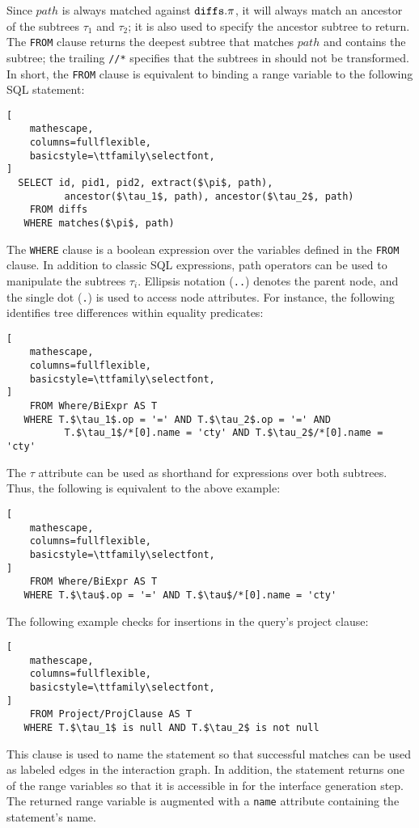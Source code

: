 Since $path$ is always matched against $\text{\texttt{diffs}}.\pi$, it will always match an ancestor of the subtrees $\tau_1$ and $\tau_2$; it is also used to specify the ancestor subtree to return.  The \texttt{FROM} clause returns the deepest subtree that matches $path$ and contains the subtree; the trailing \texttt{//*} specifies that the subtrees in \difftable should not be transformed.  In short, the \texttt{FROM} clause is equivalent to binding a range variable to the following SQL statement:
{\small
\begin{lstlisting}[
	mathescape,
	columns=fullflexible,
	basicstyle=\ttfamily\selectfont,
]
  SELECT id, pid1, pid2, extract($\pi$, path),
          ancestor($\tau_1$, path), ancestor($\tau_2$, path)
    FROM diffs
   WHERE matches($\pi$, path)
\end{lstlisting}
}

 The \texttt{WHERE} clause is a boolean expression over the variables defined in the \texttt{FROM} clause. In addition to classic SQL expressions, path operators can be used to manipulate the subtrees $\tau_i$. Ellipsis notation (\texttt{..}) denotes the parent node, and the single dot (\texttt{.}) is used to access node attributes.  For instance, the following identifies tree differences within equality predicates:
{\small
\begin{lstlisting}[
	mathescape,
	columns=fullflexible,
	basicstyle=\ttfamily\selectfont,
]
    FROM Where/BiExpr AS T
   WHERE T.$\tau_1$.op = '=' AND T.$\tau_2$.op = '=' AND
          T.$\tau_1$/*[0].name = 'cty' AND T.$\tau_2$/*[0].name = 'cty'
\end{lstlisting}
}
The $\tau$ attribute can be used as shorthand for expressions over both subtrees.  Thus, the following is equivalent to the above example:
{\small
\begin{lstlisting}[
	mathescape,
	columns=fullflexible,
	basicstyle=\ttfamily\selectfont,
]
    FROM Where/BiExpr AS T
   WHERE T.$\tau$.op = '=' AND T.$\tau$/*[0].name = 'cty'
\end{lstlisting}
}
The following example checks for insertions in the query's project clause:
{\small
\begin{lstlisting}[
	mathescape,
	columns=fullflexible,
	basicstyle=\ttfamily\selectfont,
]
    FROM Project/ProjClause AS T
   WHERE T.$\tau_1$ is null AND T.$\tau_2$ is not null
\end{lstlisting}
}



 This clause is used to name the \lang statement so that successful matches can be used as labeled edges in the interaction graph.  In addition, the statement returns one of the range variables so that it is accessible in for the interface generation step.  The returned range variable is augmented with a \texttt{name} attribute containing the statement's name.

